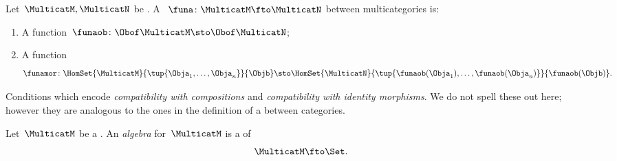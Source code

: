 \begin{ctdefinition}
    \label{def:functors-multicats}
    Let~$\MulticatM,\MulticatN$ be .
    A ~$\funa\colon \MulticatM \fto \MulticatN$ between multicategories is:

    \constit
    \begin{enumerate}
        \item A function~$\funaob\colon \Obof\MulticatM\sto \Obof\MulticatN$;
        \item A function
              \begin{equation}
                  \funamor\colon \HomSet{\MulticatM}{\tup{\Obja_1,\ldots,\Obja_n}}{\Objb}\sto \HomSet{\MulticatN}{\tup{\funaob(\Obja_1),\ldots, \funaob(\Obja_n)}}{\funaob(\Objb)}.
              \end{equation}
    \end{enumerate}

    \condit

    Conditions which encode \emph{compatibility with compositions} and \emph{compatibility with identity morphisms}.
    We do not spell these out here; however they are analogous to the ones in the definition of a  between categories.
\end{ctdefinition}


\begin{ctdefinition}
    \label{def:algebra-of-multicat}
    Let~$\MulticatM$ be a .
    An \emph{algebra} for~$\MulticatM$ is a  of 
    $$\MulticatM \fto \Set.
    $$
\end{ctdefinition}


    \begin{example}
    \end{example}


    \begin{example}

    \end{example}


